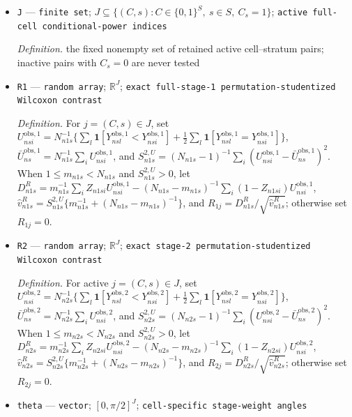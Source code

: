 \documentclass{article}
\begin{document}
\begin{itemize}
  \item \texttt{J} --- \texttt{finite set}; \(J\subseteq\{(C,s):C\in\{0,1\}^{S},\ s\in S,\ C_s=1\}\); \texttt{active full-\allowbreak{}cell conditional-\allowbreak{}power indices}
  \par\smallskip\noindent\emph{Definition.} the fixed nonempty set of retained active cell--stratum pairs; inactive pairs with \(C_s=0\) are never tested
  \item \texttt{R1} --- \texttt{random array}; \(\mathbb R^{J}\); \texttt{exact full-\allowbreak{}stage-\allowbreak{}1 permutation-\allowbreak{}studentized Wilcoxon contrast}
  \par\smallskip\noindent\emph{Definition.} For \(j=(C,s)\in J\), set \(U^{\mathrm{obs},1}_{nsi}=N_{n1s}^{-1}\{\sum_l\mathbf 1[Y^{\mathrm{obs},1}_{nsl}<Y^{\mathrm{obs},1}_{nsi}]+\tfrac12\sum_l\mathbf 1[Y^{\mathrm{obs},1}_{nsl}=Y^{\mathrm{obs},1}_{nsi}]\}\), \(\bar U^{\mathrm{obs},1}_{ns}=N_{n1s}^{-1}\sum_iU^{\mathrm{obs},1}_{nsi}\), and \(S^{2,U}_{n1s}=(N_{n1s}-1)^{-1}\sum_i(U^{\mathrm{obs},1}_{nsi}-\bar U^{\mathrm{obs},1}_{ns})^2\). When \(1\le m_{n1s}<N_{n1s}\) and \(S^{2,U}_{n1s}>0\), let \(D^R_{n1s}=m_{n1s}^{-1}\sum_iZ_{n1si}U^{\mathrm{obs},1}_{nsi}-(N_{n1s}-m_{n1s})^{-1}\sum_i(1-Z_{n1si})U^{\mathrm{obs},1}_{nsi}\), \(\widehat v^R_{n1s}=S^{2,U}_{n1s}\{m_{n1s}^{-1}+(N_{n1s}-m_{n1s})^{-1}\}\), and \(R_{1j}=D^R_{n1s}/\sqrt{\widehat v^R_{n1s}}\); otherwise set \(R_{1j}=0\).
  \item \texttt{R2} --- \texttt{random array}; \(\mathbb R^{J}\); \texttt{exact stage-\allowbreak{}2 permutation-\allowbreak{}studentized Wilcoxon contrast}
  \par\smallskip\noindent\emph{Definition.} For active \(j=(C,s)\in J\), set \(U^{\mathrm{obs},2}_{nsi}=N_{n2s}^{-1}\{\sum_l\mathbf 1[Y^{\mathrm{obs},2}_{nsl}<Y^{\mathrm{obs},2}_{nsi}]+\tfrac12\sum_l\mathbf 1[Y^{\mathrm{obs},2}_{nsl}=Y^{\mathrm{obs},2}_{nsi}]\}\), \(\bar U^{\mathrm{obs},2}_{ns}=N_{n2s}^{-1}\sum_iU^{\mathrm{obs},2}_{nsi}\), and \(S^{2,U}_{n2s}=(N_{n2s}-1)^{-1}\sum_i(U^{\mathrm{obs},2}_{nsi}-\bar U^{\mathrm{obs},2}_{ns})^2\). When \(1\le m_{n2s}<N_{n2s}\) and \(S^{2,U}_{n2s}>0\), let \(D^R_{n2s}=m_{n2s}^{-1}\sum_iZ_{n2si}U^{\mathrm{obs},2}_{nsi}-(N_{n2s}-m_{n2s})^{-1}\sum_i(1-Z_{n2si})U^{\mathrm{obs},2}_{nsi}\), \(\widehat v^R_{n2s}=S^{2,U}_{n2s}\{m_{n2s}^{-1}+(N_{n2s}-m_{n2s})^{-1}\}\), and \(R_{2j}=D^R_{n2s}/\sqrt{\widehat v^R_{n2s}}\); otherwise set \(R_{2j}=0\).
  \item \texttt{theta} --- \texttt{vector}; \([0,\pi/2]^J\); \texttt{cell-\allowbreak{}specific stage-\allowbreak{}weight angles}

\end{itemize}
\end{document}
